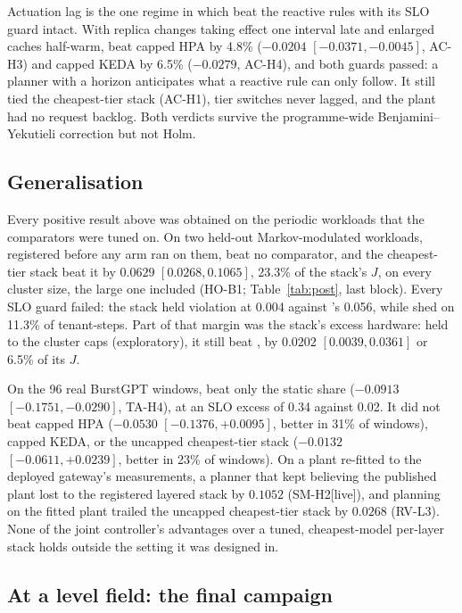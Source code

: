 Actuation lag is the one regime in which \jcac{} beat the reactive rules
with its SLO guard intact. With replica changes taking effect one interval
late and enlarged caches half-warm, \jcac{} beat capped HPA by 4.8\%
($-0.0204$ $[-0.0371,-0.0045]$, AC-H3) and capped KEDA by 6.5\%
($-0.0279$, AC-H4), and both guards passed: a planner with a horizon
anticipates what a reactive rule can only follow. It still tied the
cheapest-tier stack (AC-H1), tier switches never lagged, and the plant had
no request backlog. Both verdicts survive the programme-wide
Benjamini--Yekutieli correction but not Holm.

\subsection{Generalisation}
\label{sec:generalise}

Every positive result above was obtained on the periodic workloads that
the comparators were tuned on. On two held-out Markov-modulated workloads,
registered before any arm ran on them, \jcac{} beat no comparator, and the
cheapest-tier stack beat it by $0.0629$ $[0.0268,0.1065]$, 23.3\% of the
stack's $J$, on every cluster size, the large one included (HO-B1;
Table~\ref{tab:post}, last block). Every SLO guard failed: the stack held
violation at 0.004 against \jcac{}'s 0.056, while \jcac{} shed on 11.3\% of
tenant-steps. Part of that margin was the stack's excess hardware: held to
the cluster caps (exploratory), it still beat \jcac{}, by $0.0202$
$[0.0039,0.0361]$ or 6.5\% of its $J$.

On the 96 real BurstGPT windows, \jcac{} beat only the static share
($-0.0913$ $[-0.1751,-0.0290]$, TA-H4), at an SLO excess of 0.34 against
0.02. It did not beat capped HPA ($-0.0530$ $[-0.1376,+0.0095]$, better in
31\% of windows), capped KEDA, or the uncapped cheapest-tier stack
($-0.0132$ $[-0.0611,+0.0239]$, better in 23\% of windows). On a plant re-fitted to
the deployed gateway's measurements, a planner that kept believing the
published plant lost to the registered layered stack by $0.1052$
(SM-H2[live]), and \jcac{} planning on the fitted plant trailed the
uncapped cheapest-tier stack by $0.0268$ (RV-L3). None of the joint controller's
advantages over a tuned, cheapest-model per-layer stack holds outside the
setting it was designed in.

\subsection{At a level field: the final campaign}
\label{sec:level}

